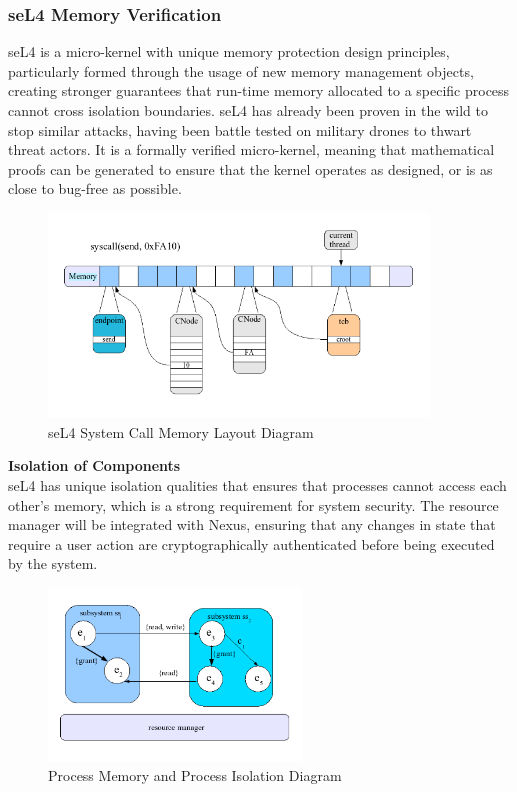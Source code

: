 \documentclass[11pt]{article}
\begin{document}
\subsubsection{seL4 Memory Verification}

seL4 is a micro-kernel with unique memory protection design principles, particularly formed through the usage of new memory management objects, creating stronger guarantees that run-time memory allocated to a specific process cannot cross isolation boundaries. 
seL4 has already been proven in the wild to stop similar attacks, having been battle tested on military drones to thwart threat actors.
It is a formally verified micro-kernel, meaning that mathematical proofs can be generated to ensure that the kernel operates as designed, or is as close to bug-free as possible.

\begin{figure}[h]
    \centering
    \includegraphics[width=0.9\textwidth]{./images/rsz_syscall.png}
    \vspace{-20}
    \caption{seL4 System Call Memory Layout Diagram \cite{seL4-syscall}}
\end{figure}

\bigskip
{\noindent\textbf{Isolation of Components}} \\

\noindent seL4 has unique isolation qualities that ensures that processes cannot access each other's memory, which is a strong requirement for system security.
The resource manager will be integrated with Nexus, ensuring that any changes in state that require a user action are cryptographically authenticated before being executed by the system. 

\begin{figure}[h]
    \centering
    \includegraphics[width=0.6\textwidth]{./images/rsz_isolation.png}
    \vspace{-20}
    \caption{Process Memory and Process Isolation Diagram \cite{seL4-syscall}}
\end{figure}
\end{document}

